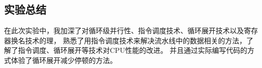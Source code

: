 \documentclass[a4paper,twoside]{article}
\begin{document}
\begin{spacing}{1.2}
\clearpage

\section{实验总结}

在此次实验中，我加深了对循环级并行性、指令调度技术、循环展开技术以及寄存器换名技术的理，
熟悉了用指令调度技术来解决流水线中的数据相关的方法，了解了指令调度、循环展开等技术对CPU性能的改进。
并且通过实际编写代码的方式体验了循环展开减少停顿的方法。

\end{spacing}
\end{document}
